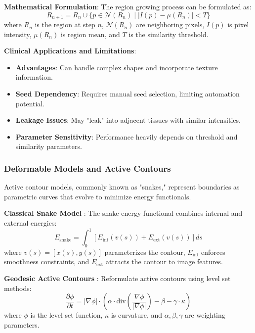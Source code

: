 \documentclass[12pt,a4paper]{article}
\begin{document}
\textbf{Mathematical Formulation}:
The region growing process can be formulated as:
\begin{equation}
R_{n+1} = R_n \cup \{p \in \mathcal{N}(R_n) \mid |I(p) - \mu(R_n)| < T\}
\end{equation}
where $R_n$ is the region at step $n$, $\mathcal{N}(R_n)$ are neighboring pixels, $I(p)$ is pixel intensity, $\mu(R_n)$ is region mean, and $T$ is the similarity threshold.

\textbf{Clinical Applications and Limitations}:
\begin{itemize}
    \item \textbf{Advantages}: Can handle complex shapes and incorporate texture information.
    \item \textbf{Seed Dependency}: Requires manual seed selection, limiting automation potential.
    \item \textbf{Leakage Issues}: May "leak" into adjacent tissues with similar intensities.
    \item \textbf{Parameter Sensitivity}: Performance heavily depends on threshold and similarity parameters.
\end{itemize}

\subsubsection{Deformable Models and Active Contours}

Active contour models, commonly known as "snakes," represent boundaries as parametric curves that evolve to minimize energy functionals.

\textbf{Classical Snake Model} \cite{kass1988snakes}:
The snake energy functional combines internal and external energies:
\begin{equation}
E_{\text{snake}} = \int_0^1 \left[ E_{\text{int}}(v(s)) + E_{\text{ext}}(v(s)) \right] ds
\end{equation}
where $v(s) = [x(s), y(s)]$ parameterizes the contour, $E_{\text{int}}$ enforces smoothness constraints, and $E_{\text{ext}}$ attracts the contour to image features.

\textbf{Geodesic Active Contours} \cite{caselles1997geodesic}:
Reformulate active contours using level set methods:
\begin{equation}
\frac{\partial \phi}{\partial t} = |\nabla \phi| \cdot \left( \alpha \cdot \text{div}\left(\frac{\nabla \phi}{|\nabla \phi|}\right) - \beta - \gamma \cdot \kappa \right)
\end{equation}
where $\phi$ is the level set function, $\kappa$ is curvature, and $\alpha, \beta, \gamma$ are weighting parameters.
\end{document}
